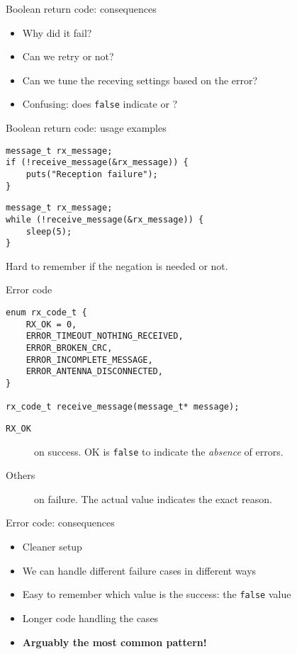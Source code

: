 \documentclass[aspectratio=169,14pt]{beamer}
\begin{document}
\begin{frame}[fragile]{Boolean return code: consequences}
\begin{itemize}
    \item Why did it fail?
    \item Can we retry or not?
    \item Can we tune the receving settings based on the error?
    \item Confusing: does \texttt{false} indicate  or ?
\end{itemize}
\end{frame}


\begin{frame}[fragile]{Boolean return code: usage examples}
\begin{lstlisting}[style=cstyle]
message_t rx_message;
if (!receive_message(&rx_message)) {
    puts("Reception failure");
}
\end{lstlisting}

\begin{lstlisting}[style=cstyle]
message_t rx_message;
while (!receive_message(&rx_message)) {
    sleep(5);
}
\end{lstlisting}

Hard to remember if the negation is needed or not.
\end{frame}


\begin{frame}[fragile]{Error code}
\begin{lstlisting}[style=cstyle]
enum rx_code_t {
    RX_OK = 0,
    ERROR_TIMEOUT_NOTHING_RECEIVED,
    ERROR_BROKEN_CRC,
    ERROR_INCOMPLETE_MESSAGE,
    ERROR_ANTENNA_DISCONNECTED,
}

rx_code_t receive_message(message_t* message);
\end{lstlisting}

\begin{description}
    \item[\texttt{RX\_OK}] on success. OK is \texttt{false} to indicate the \textit{absence} of errors.
    \item[Others] on failure. The actual value indicates the exact reason.
\end{description}
\end{frame}


\begin{frame}[fragile]{Error code: consequences}
\begin{itemize}
    \item Cleaner setup
    \item We can handle different failure cases in different ways
    \item Easy to remember which value is the success: the \texttt{false} value
    \item Longer code handling the cases
    \item \textbf{Arguably the most common pattern!}
\end{itemize}
\end{frame}
\end{document}
